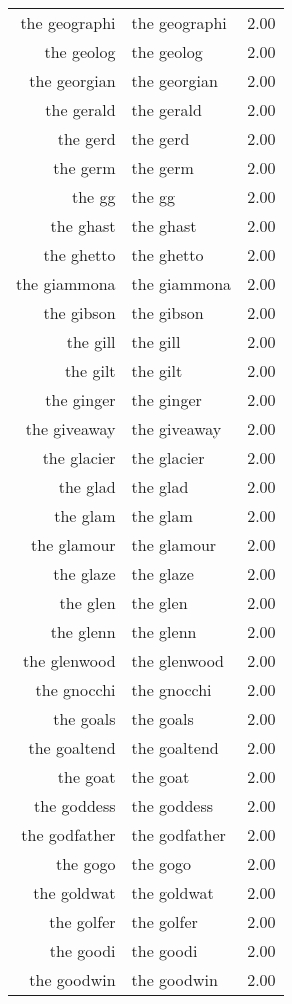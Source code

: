 \begin{table}[ht]
\begin{tabular}{rlr}
  the geographi & the geographi & 2.00 \\ 
  the geolog & the geolog & 2.00 \\ 
  the georgian & the georgian & 2.00 \\ 
  the gerald & the gerald & 2.00 \\ 
  the gerd & the gerd & 2.00 \\ 
  the germ & the germ & 2.00 \\ 
  the gg & the gg & 2.00 \\ 
  the ghast & the ghast & 2.00 \\ 
  the ghetto & the ghetto & 2.00 \\ 
  the giammona & the giammona & 2.00 \\ 
  the gibson & the gibson & 2.00 \\ 
  the gill & the gill & 2.00 \\ 
  the gilt & the gilt & 2.00 \\ 
  the ginger & the ginger & 2.00 \\ 
  the giveaway & the giveaway & 2.00 \\ 
  the glacier & the glacier & 2.00 \\ 
  the glad & the glad & 2.00 \\ 
  the glam & the glam & 2.00 \\ 
  the glamour & the glamour & 2.00 \\ 
  the glaze & the glaze & 2.00 \\ 
  the glen & the glen & 2.00 \\ 
  the glenn & the glenn & 2.00 \\ 
  the glenwood & the glenwood & 2.00 \\ 
  the gnocchi & the gnocchi & 2.00 \\ 
  the goals & the goals & 2.00 \\ 
  the goaltend & the goaltend & 2.00 \\ 
  the goat & the goat & 2.00 \\ 
  the goddess & the goddess & 2.00 \\ 
  the godfather & the godfather & 2.00 \\ 
  the gogo & the gogo & 2.00 \\ 
  the goldwat & the goldwat & 2.00 \\ 
  the golfer & the golfer & 2.00 \\ 
  the goodi & the goodi & 2.00 \\ 
  the goodwin & the goodwin & 2.00 \\ 

\end{tabular}
\end{table}
